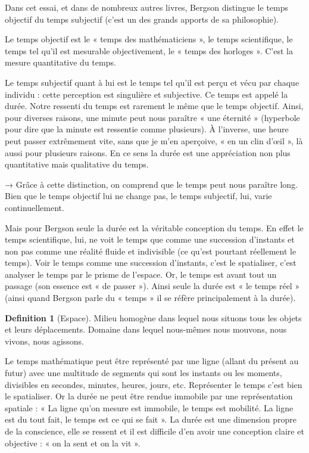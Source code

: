 \documentclass[french]{book}
\theoremstyle{definition}
\newtheorem*{dfn}{Definition}
\begin{document}
Dans cet essai, et dans de nombreux autres livres, Bergson distingue le temps objectif du temps subjectif (c’est un des grands apports de sa philosophie).


Le temps objectif est le « temps des mathématiciens », le temps scientifique, le temps tel qu’il est mesurable objectivement, le « temps des horloges ». C’est la mesure quantitative du temps.


Le temps subjectif quant à lui est le temps tel qu’il est perçu et vécu par chaque individu : cette perception est singulière et subjective. Ce temps est appelé la durée. Notre ressenti du temps est rarement le même que le temps objectif. Ainsi, pour diverses raisons, une minute peut nous paraître « une éternité » (hyperbole pour dire que la minute est ressentie comme plusieurs). À l’inverse, une heure peut passer extrêmement vite, sans que je m’en aperçoive, « en un clin d’œil », là aussi pour plusieurs raisons. En ce sens la durée est une appréciation non plus quantitative mais qualitative du temps.

→ Grâce à cette distinction, on comprend que le temps peut nous paraître long. Bien que le temps objectif lui ne change pas, le temps subjectif, lui, varie continuellement.

Mais pour Bergson seule la durée est la véritable conception du temps. En effet le temps scientifique, lui, ne voit le temps que comme une succession d’instants et non pas comme une réalité fluide et indivisible (ce qu’est pourtant réellement le temps). Voir le temps comme une succession d’instants, c’est le spatialiser, c’est analyser le temps par le prisme de l’espace. Or, le temps est avant tout un passage (son essence est « de passer »). Ainsi seule la durée est « le temps réel » (ainsi quand Bergson parle du « temps » il se réfère principalement à la durée).

\begin{dfn}[Espace]
Milieu homogène dans lequel nous situons tous les objets et leurs déplacements. Domaine dans lequel nous-mêmes nous mouvons, nous vivons, nous agissons.
\end{dfn}

Le temps mathématique peut être représenté par une ligne (allant du présent au futur) avec une multitude de segments qui sont les instants ou les moments, divisibles en secondes, minutes, heures, jours, etc. Représenter le temps c’est bien le spatialiser. Or la durée ne peut être rendue immobile par une représentation spatiale : « La ligne qu’on mesure est immobile, le temps est mobilité. La ligne est du tout fait, le temps est ce qui se fait ». La durée est une dimension propre de la conscience, elle se ressent et il est difficile d’en avoir une conception claire et objective : « on la sent et on la vit ».
\end{document}
